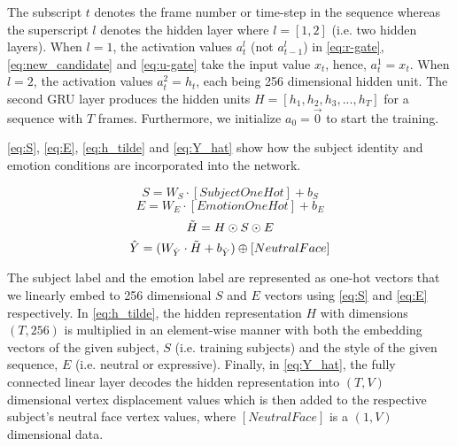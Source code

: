\documentclass[10pt,twocolumn,letterpaper]{article}
\begin{document}
The subscript $t$ denotes the frame number or time-step in the sequence whereas the superscript $l$ denotes the hidden layer where $l = [1,2]$ (i.e. two hidden layers). When $l=1$, the activation values $a_t^{l}$ (not $a_{t-1}^{l}$) in \cref{eq:r-gate}, \cref{eq:new_candidate} and \cref{eq:u-gate} take the input value $x_t$, hence, $a_t^{1}=x_t$. When $l=2$, the activation values $a_t^{2} = h_t$, each being 256 dimensional hidden unit. The second GRU layer produces the hidden units $H = [h_1, h_2, h_3, ..., h_T]$ for a sequence with $T$ frames. Furthermore, we initialize $a_0 = \Vec{0}$ to start the training.  

\cref{eq:S}, \cref{eq:E}, \cref{eq:h_tilde} and \cref{eq:Y_hat} show how the subject identity and emotion conditions are incorporated into the network.

\begin{equation}
  S = W_S \cdot [SubjectOneHot] + b_S
  \label{eq:S}
\end{equation}
\vspace{-1.5em}
\begin{equation}
  E = W_E \cdot [EmotionOneHot] + b_E
  \label{eq:E}
\end{equation}
\vspace{-1.5em}
\begin{equation}
  \Tilde{H} = H \odot S \odot E
  \label{eq:h_tilde}
\end{equation}
\vspace{-1.5em}
\begin{equation}
  \hat{Y} = (W_{\hat{Y}} \cdot \Tilde{H} + b_{\hat{Y}}) \oplus [NeutralFace] 
  \label{eq:Y_hat}
\end{equation}

The subject label and the emotion label are represented as one-hot vectors that we linearly embed to 256 dimensional $S$ and $E$ vectors using \cref{eq:S} and \cref{eq:E} respectively. In \cref{eq:h_tilde}, the hidden representation $H$ with dimensions $(T,256)$ is multiplied in an element-wise manner with both the embedding vectors of the given subject, $S$ (i.e. training subjects) and the style of the given sequence, $E$ (i.e. neutral or expressive). Finally, in \cref{eq:Y_hat}, the fully connected linear layer decodes the hidden representation into $(T,V)$ dimensional vertex displacement values which is then added to the respective subject's neutral face vertex values, where $[NeutralFace]$ is a $(1,V)$ dimensional data. 
\end{document}
